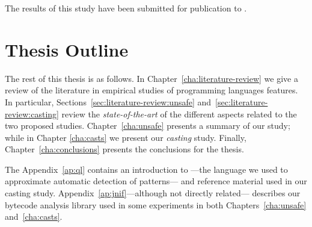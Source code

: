 The results of this study have been submitted for publication to .

\section{Thesis Outline}

The rest of this thesis is as follows.
In Chapter~\ref{cha:literature-review} we give a review of the literature in empirical studies of programming languages features.
In particular, Sections~\ref{sec:literature-review:unsafe} and~\ref{sec:literature-review:casting} review the \emph{state-of-the-art} of the different aspects related to the two proposed studies.
Chapter~\ref{cha:unsafe} presents a summary of our \unsafe{} study;
while in Chapter \ref{cha:casts} we present our \emph{casting} study.
Finally, Chapter~\ref{cha:conclusions} presents the conclusions for the thesis.

The Appendix~\ref{ap:ql} contains an introduction to \ql{}%
---the language we used to approximate automatic detection of patterns---%
and reference material used in our casting study.
Appendix~\ref{ap:jnif}---although not directly related---%
describes our bytecode analysis library used in some experiments in both Chapters~\ref{cha:unsafe} and~\ref{cha:casts}.
